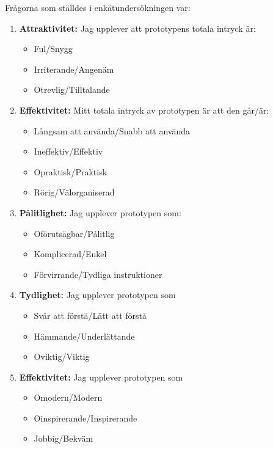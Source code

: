 Frågorna som ställdes i enkätundersökningen var: 

\begin{enumerate}
\item \textbf{Attraktivitet:}
\newline
Jag upplever att prototypens totala intryck är:
\begin{itemize}
\item Ful/Snygg
\item Irriterande/Angenäm
\item Otrevlig/Tilltalande
\newline
\end{itemize}

\item \textbf{Effektivitet:}
\newline
Mitt totala intryck av prototypen är att den går/är:
\begin{itemize}
\item Långsam att använda/Snabb att använda
\item Ineffektiv/Effektiv
\item Opraktisk/Praktisk
\item Rörig/Välorganiserad
\newline
\end{itemize}


\item \textbf{Pålitlighet:}
\newline
Jag upplever prototypen som:
\begin{itemize}
\item Oförutsägbar/Pålitlig
\item Komplicerad/Enkel
\item Förvirrande/Tydliga instruktioner
\newline
\end{itemize}


\item \textbf{Tydlighet:}
\newline
Jag upplever prototypen som
\begin{itemize}
\item Svår att förstå/Lätt att förstå
\item Hämmande/Underlättande
\item Oviktig/Viktig
\newline
\end{itemize}

\item \textbf{Effektivitet:}
\newline
Jag upplever prototypen som
\begin{itemize}
\item Omodern/Modern
\item Oinspirerande/Inspirerande
\item Jobbig/Bekväm
\newline
\end{itemize}

\end{enumerate}

